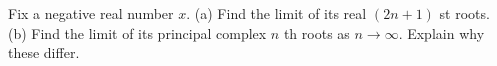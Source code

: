 Fix a negative real number $x$. (a) Find the limit of its real $(2n+1)$ st roots. (b) Find the limit of its principal complex $n$ th roots as $n\to\infty$. Explain why these differ.
